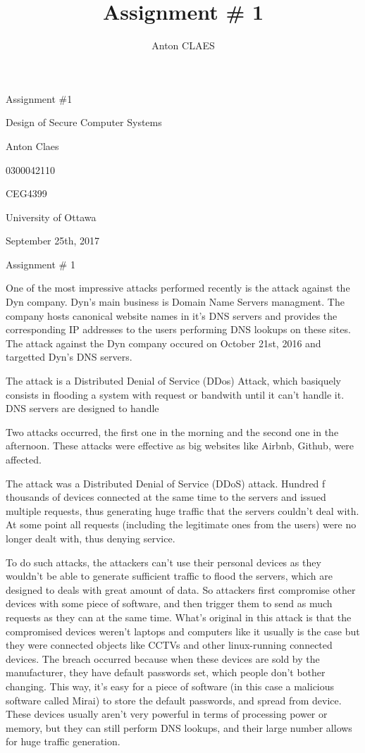\documentclass[a4paper,man,natbib,12]{apa6}
\title{Assignment \# 1}
\author{Anton CLAES}
\affiliation{University of Ottawa}
\begin{document}
\thispagestyle{empty}

\begin{center}
\vspace*{5\baselineskip}
Assignment \#1

Design of Secure Computer Systems

\vspace*{10\baselineskip}

Anton Claes

0300042110

CEG4399

University of Ottawa

September 25th, 2017

\newpage

Assignment \# 1
\end{center}

\qquad One of the most impressive attacks performed recently is the attack against the Dyn company. Dyn's main business is Domain Name Servers managment. The company hosts canonical website names in it's DNS servers and provides the corresponding IP addresses to the users performing DNS lookups on these sites. The attack against the Dyn company occured on October 21st, 2016 and targetted Dyn's DNS servers. 

\cite{Dyn}

\qquad The attack is a Distributed Denial of Service (DDos) Attack, which basiquely consists in flooding a system with request or bandwith until it can't handle it. DNS servers are designed to handle 

\qquad Two attacks occurred, the first one in the morning and the second one in the afternoon. These attacks were effective as big websites like Airbnb, Github, were affected. 

\qquad The attack was a Distributed Denial of Service (DDoS) attack. Hundred f thousands of devices connected at the same time to the servers and issued multiple requests, thus generating huge traffic that the servers couldn’t deal with. At some point all requests (including the legitimate ones from the users) were no longer dealt with, thus denying service.

\qquad To do such attacks, the attackers can’t use their personal devices as they wouldn’t be able to generate sufficient traffic to flood the servers, which are designed to deals with great amount of data. So attackers first compromise other devices with some piece of software, and then trigger them to send as much requests as they can at the same time. What’s original in this attack is that the compromised devices weren’t laptops and computers like it usually is the case but they were connected objects like CCTVs and other linux-running connected devices. The breach occurred because when these devices are sold by the manufacturer, they have default passwords set, which people don’t bother changing. This way, it’s easy for a piece of software (in this case a malicious software called Mirai) to store the default passwords, and spread from device. These devices usually aren’t very powerful in terms of processing power or memory, but they can still perform DNS lookups, and their large number allows for huge traffic generation. 
\end{document}
